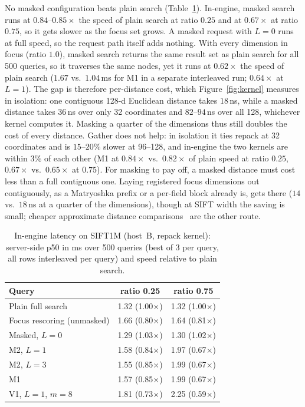 \documentclass[sigconf,review,balance=false]{acmart}
\begin{document}
No masked configuration beats plain search (Table~\ref{tab:latency}).
In-engine, masked search runs at $0.84$--$0.85\times$ the speed of plain
search at ratio $0.25$ and at $0.67\times$ at ratio $0.75$, so it gets slower
as the focus set grows. A masked request with $L{=}0$ runs at full speed, so
the request path itself adds nothing. With every dimension in focus (ratio
$1.0$), masked search returns the same result set as plain search for all
500 queries, so it traverses the same nodes, yet it runs at $0.62\times$ the
speed of plain search ($1.67$ vs.\ $1.04$\,ms for M1 in a separate
interleaved run; $0.64\times$ at $L{=}1$). The gap is therefore per-distance
cost, which Figure~\ref{fig:kernel} measures in isolation: one contiguous
128-d Euclidean distance takes $18$\,ns, while a masked distance takes
$36$\,ns over only 32 coordinates and $82$--$94$\,ns over all 128, whichever
kernel computes it. Masking a quarter of the dimensions thus still doubles
the cost of every distance. Gather does not help: in isolation it ties
repack at 32 coordinates and is $15$--$20\%$ slower at 96--128, and
in-engine the two kernels are within $3\%$ of each other (M1 at $0.84\times$
vs.\ $0.82\times$ of plain speed at ratio $0.25$, $0.67\times$ vs.\
$0.65\times$ at $0.75$). For masking to pay off, a masked distance must cost
less than a full contiguous one. Laying registered focus dimensions out
contiguously, as a Matryoshka prefix or a per-field block already is, gets
there ($14$ vs.\ $18$\,ns at a quarter of the dimensions), though at SIFT
width the saving is small; cheaper approximate distance
comparisons~\cite{gao2023adsampling,chen2023finger,gao2024rabitq} are the
other route.

\begin{table}[htbp]
  \centering
  \caption{In-engine latency on SIFT1M (host~B, repack kernel): server-side
    p50 in ms over 500 queries (best of 3 per query, all rows interleaved per
    query) and speed relative to plain search.}
  \label{tab:latency}
  \small
  \begin{tabular}{@{}lcc@{}}
    \hline
    \textbf{Query} & \textbf{ratio 0.25} & \textbf{ratio 0.75} \\
    \hline
    Plain full search & 1.32 (1.00$\times$) & 1.32 (1.00$\times$) \\
    Focus rescoring (unmasked) & 1.66 (0.80$\times$) & 1.64 (0.81$\times$) \\
    Masked, $L{=}0$ & 1.29 (1.03$\times$) & 1.30 (1.02$\times$) \\
    M2, $L{=}1$ & 1.58 (0.84$\times$) & 1.97 (0.67$\times$) \\
    M2, $L{=}3$ & 1.55 (0.85$\times$) & 1.99 (0.67$\times$) \\
    M1 & 1.57 (0.85$\times$) & 1.99 (0.67$\times$) \\
    V1, $L{=}1$, $m{=}8$ & 1.81 (0.73$\times$) & 2.25 (0.59$\times$) \\
    \hline
  \end{tabular}
\end{table}
\end{document}

